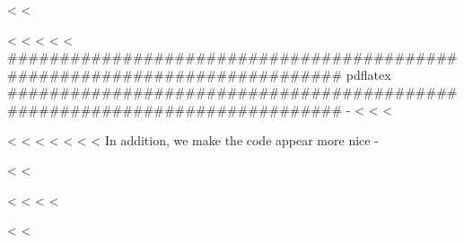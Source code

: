 \setsansfont[%
ItalicFont=NewCMSans10-Oblique.otf,%
BoldFont=NewCMSans10-Bold.otf,%
BoldItalicFont=NewCMSans10-BoldOblique.otf,%
SmallCapsFeatures={Numbers=OldStyle}]{NewCMSans10-Regular.otf}

\setmonofont[ItalicFont=NewCMMono10-Italic.otf,%
BoldFont=NewCMMono10-Bold.otf,%
BoldItalicFont=NewCMMono10-BoldOblique.otf,%
SmallCapsFeatures={Numbers=OldStyle}]{NewCMMono10-Regular.otf}

<%
<%

\usepackage{selnolig}
<%
<%
<%
\else
<%
<%
###########################################################################
pdflatex
###########################################################################
-%
<%
<%
<%
\usepackage[scaled=.95]{helvet}
<%
<%
<%
\RequirePackage{newtxtext}
\RequirePackage{newtxmath}
\RequirePackage[zerostyle=b,scaled=.9]{newtxtt}
<%
<%
<%
<%
In addition, we make the code appear more nice -%
\usepackage[zerostyle=b,scaled=.75]{newtxtt}
<%
<%
\usepackage{XCharter}
\usepackage[scaled=.95]{helvet}
<%
<%
<%
<%
\usepackage[%
    rm={oldstyle=false,proportional=true},%
    sf={oldstyle=false,proportional=true},%
    tt={oldstyle=false,proportional=true,variable=false},%
    qt=false%
]{cfr-lm}
<%
<%

